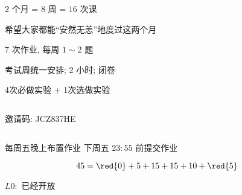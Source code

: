 
\begin{frame}{}
  \begin{center}
    {\large $2$ 个月 = $8$ 周 = $16$ 次课}
  \end{center}

  \pause
  \begin{center}
    希望大家都能``安然无恙''地度过这两个月
  \end{center}
\end{frame}

\begin{frame}{}
  \begin{center}
     7 次作业, 每周 $1 \sim 2$ 题
    \vspace{1.00cm}

     考试周统一安排; 2 小时; 闭卷

    \vspace{1.00cm}
     4次必做实验 + 1次选做实验 
  \end{center}
\end{frame}

\begin{frame}{}
  \begin{columns}
      \begin{center}
        邀请码: JCZ837HE
      \end{center}
  \end{columns}

  \vspace{1.0cm}
  \begin{center}
    每周五晚上布置作业 \qquad 下周五 $23:55$ 前提交作业
  \end{center}
\end{frame}

\begin{frame}{}
  \[
    45 = \red{0} + 5 + 15 + 15 + 10 + \red{5}
  \]

  \vspace{0.30cm}

  \begin{center}
    $L0:$ 已经开放
  \end{center}
\end{frame}

